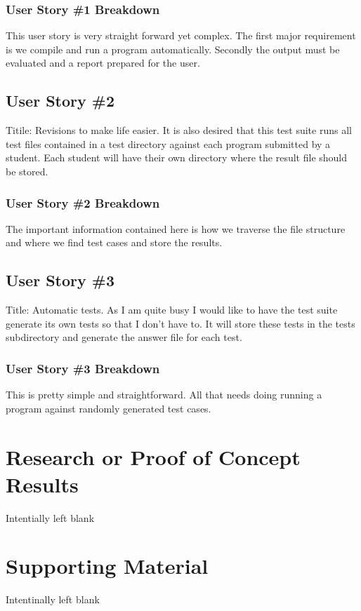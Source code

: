 \subsubsection{User Story \#1 Breakdown}
This user story is very straight forward yet complex. The first major requirement is we compile and run a program automatically. Secondly the output must be evaluated and a report prepared for the user.

\subsection{User Story \#2} 
Titile: Revisions to make life  easier. It is also desired that this test suite runs all test files contained in a test directory against each program submitted by a student. Each student will have their own directory where the result file should be stored. 

\subsubsection{User Story \#2 Breakdown}
The important information contained here is how we traverse the file structure and where we find test cases and store the results.

\subsection{User Story \#3} 
Title: Automatic tests. As I am quite busy I would like to have the test suite generate its own tests so that I don't have to. It will store these tests in the tests subdirectory and generate the answer file for each test. 


\subsubsection{User Story \#3 Breakdown}
This is pretty simple and straightforward. All that needs doing running a program against randomly generated test cases.


\section{Research or Proof of Concept Results}
Intentially left blank


\section{Supporting Material}
Intentinally left blank